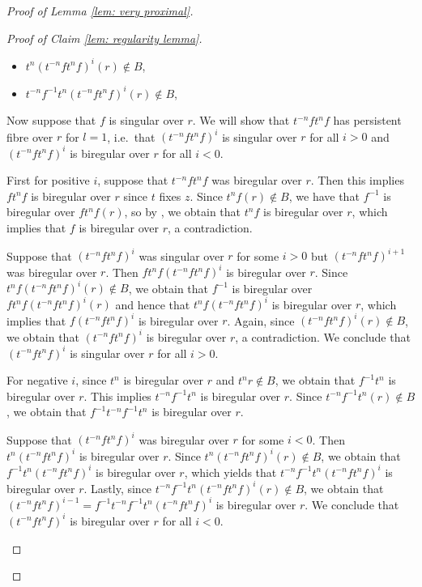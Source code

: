 \documentclass[12pt]{article}
\theoremstyle{definition}
\begin{document}
\begin{proof} [Proof of Lemma \ref{lem: very proximal}]
\begin{proof}[Proof of Claim \ref{lem: regularity lemma}]
\begin{enumerate}
\begin{enumerate}
\begin{enumerate}
     \begin{itemize} 
        \item $t^n(t^{-n}ft^n f)^{i} (r) \notin B$,
        \item $t^{-n}f^{-1}t^n(t^{-n}ft^n f)^{i} (r) \notin B$,
    \end{itemize}

    Now suppose that $f$ is singular over $r$. We will show that $t^{-n} f t^n f$ has persistent fibre over $r$ for $l = 1$, i.e.\ that $(t^{-n} f t^n f)^i$ is singular over $r$ for all $i > 0$ and $(t^{-n} f t^n f)^{i}$ is biregular over $r$ for all $i < 0$. 

    First for positive $i$, suppose that $t^{-n} f t^n f$ was biregular over $r$. Then this implies $ft^n f$ is biregular over $r$ since $t$ fixes $z$. Since $t^n f (r) \notin B$, we have that $f^{-1}$ is biregular over $ft^n f (r)$, so by \cite[Remark 4.4]{Algebraic}, we obtain that $t^n f$ is biregular over $r$, which implies that $f$ is biregular over $r$, a contradiction. 

    Suppose that $(t^{-n} f t^n f)^i$ was singular over $r$ for some $i > 0$ but $(t^{-n} f t^n f)^{i+1}$ was biregular over $r$. Then $ft^n f(t^{-n} f t^n f)^i$ is biregular over $r$. Since $t^n f(t^{-n} f t^n f)^i(r) \notin B$, we obtain that $f^{-1}$ is biregular over $ft^n f(t^{-n} f t^n f)^i(r)$ and hence that \newline $t^n f(t^{-n} f t^n f)^i$ is biregular over $r$, which implies that $f(t^{-n} f t^n f)^i$ is biregular over $r$. Again, since $(t^{-n} f t^n f)^i(r) \notin B$, we obtain that $(t^{-n} f t^n f)^i$ is biregular over $r$, a contradiction. We conclude that $(t^{-n} f t^n f)^i$ is singular over $r$ for all $i > 0$. 

    For negative $i$, since $t^n$ is biregular over $r$ and $t^n r \notin B$, we obtain that $f^{-1} t^n $ is biregular over $r$. This implies $t^{-n} f^{-1} t^n$ is biregular over $r$. Since $t^{-n} f^{-1} t^n (r) \notin B$, we obtain that $f^{-1}t^{-n} f^{-1} t^n$ is biregular over $r$. 

    Suppose that $(t^{-n} f t^n f)^i$ was biregular over $r$ for some $i < 0$. Then $t^n (t^{-n} f t^n f)^i$ is biregular over $r$. Since $t^n (t^{-n} f t^n f)^i (r) \notin B$, we obtain that $f^{-1}t^n(t^{-n} f t^n f)^i$ is biregular over $r$, which yields that $t^{-n}f^{-1}t^n(t^{-n} f t^n f)^i$ is biregular over $r$. Lastly, since $t^{-n}f^{-1}t^n(t^{-n} f t^n f)^i (r) \notin B$, we obtain that $(t^{-n} f t^n f)^{i-1} = f^{-1}t^{-n}f^{-1}t^n(t^{-n} f t^n f)^i$ is biregular over $r$. We conclude that $(t^{-n} f t^n f)^i$ is biregular over $r$ for all $i < 0$. 


\end{enumerate}
\end{enumerate}
\end{enumerate}
\end{proof}
\end{proof}
\end{document}
